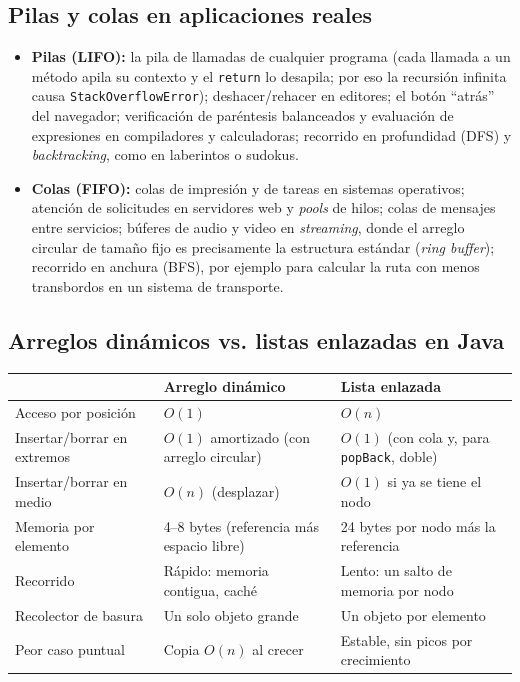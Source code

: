\documentclass[11pt,a4paper]{article}
\newcommand{\Oone}{$O(1)$}
\newcommand{\On}{$O(n)$}
\begin{document}
\subsection{Pilas y colas en aplicaciones reales}
\begin{itemize}
\item \textbf{Pilas (LIFO):} la pila de llamadas de cualquier programa (cada llamada a un método apila
  su contexto y el \texttt{return} lo desapila; por eso la recursión infinita causa
  \texttt{StackOverflowError}); deshacer/rehacer en editores; el botón ``atrás'' del navegador;
  verificación de paréntesis balanceados y evaluación de expresiones en compiladores y calculadoras;
  recorrido en profundidad (DFS) y \emph{backtracking}, como en laberintos o sudokus.
\item \textbf{Colas (FIFO):} colas de impresión y de tareas en sistemas operativos; atención de
  solicitudes en servidores web y \emph{pools} de hilos; colas de mensajes entre servicios; búferes de
  audio y video en \emph{streaming}, donde el arreglo circular de tamaño fijo es precisamente la
  estructura estándar (\emph{ring buffer}); recorrido en anchura (BFS), por ejemplo para calcular la
  ruta con menos transbordos en un sistema de transporte.
\end{itemize}

\subsection{Arreglos dinámicos vs. listas enlazadas en Java}
\begin{table}[H]\centering\small
\begin{tabular}{p{3.6cm} p{5.6cm} p{5.6cm}}
\toprule
 & \textbf{Arreglo dinámico} & \textbf{Lista enlazada} \\
\midrule
Acceso por posición & \Oone{} & \On{} \\
Insertar/borrar en extremos & \Oone{} amortizado (con arreglo circular) & \Oone{} (con cola y, para \texttt{popBack}, doble) \\
Insertar/borrar en medio & \On{} (desplazar) & \Oone{} si ya se tiene el nodo \\
Memoria por elemento & 4--8 bytes (referencia más espacio libre) & 24 bytes por nodo más la referencia \\
Recorrido & Rápido: memoria contigua, caché & Lento: un salto de memoria por nodo \\
Recolector de basura & Un solo objeto grande & Un objeto por elemento \\
Peor caso puntual & Copia \On{} al crecer & Estable, sin picos por crecimiento \\
\bottomrule
\end{tabular}
\end{table}
\end{document}
